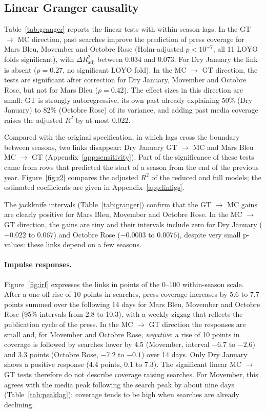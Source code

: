 \documentclass[11pt,a4paper]{article}
\begin{document}
\subsection{Linear Granger causality}
Table~\ref{tab:granger} reports the linear tests with within-season lags. In the GT $\to$ MC direction, past searches improve the prediction of press coverage for Mars Bleu, Movember and Octobre Rose (Holm-adjusted $p<10^{-7}$, all 11 LOYO folds significant), with $\Delta R^2_{\mathrm{adj}}$ between 0.034 and 0.073. For Dry January the link is absent ($p=0.27$, no significant LOYO fold). In the MC $\to$ GT direction, the tests are significant after correction for Dry January, Movember and Octobre Rose, but not for Mars Bleu ($p=0.42$). The effect sizes in this direction are small: GT is strongly autoregressive, its own past already explaining 50\% (Dry January) to 82\% (Octobre Rose) of its variance, and adding past media coverage raises the adjusted $R^2$ by at most 0.022.

Compared with the original specification, in which lags cross the boundary between seasons, two links disappear: Dry January GT $\to$ MC and Mars Bleu MC $\to$ GT (Appendix~\ref{app:sensitivity}). Part of the significance of these tests came from rows that predicted the start of a season from the end of the previous year. Figure~\ref{fig:r2} compares the adjusted $R^2$ of the reduced and full models; the estimated coefficients are given in Appendix~\ref{app:linfigs}.

The jackknife intervals (Table~\ref{tab:granger}) confirm that the GT $\to$ MC gains are clearly positive for Mars Bleu, Movember and Octobre Rose. In the MC $\to$ GT direction, the gains are tiny and their intervals include zero for Dry January ($-0.022$ to 0.067) and Octobre Rose ($-0.0003$ to 0.0076), despite very small p-values: these links depend on a few seasons.

\paragraph{Impulse responses.} Figure~\ref{fig:irf} expresses the links in points of the 0--100 within-season scale. After a one-off rise of 10 points in searches, press coverage increases by 5.6 to 7.7 points summed over the following 14 days for Mars Bleu, Movember and Octobre Rose (95\% intervals from 2.8 to 10.3), with a weekly zigzag that reflects the publication cycle of the press. In the MC $\to$ GT direction the responses are small and, for Movember and Octobre Rose, \emph{negative}: a rise of 10 points in coverage is followed by searches lower by 4.5 (Movember, interval $-6.7$ to $-2.6$) and 3.3 points (Octobre Rose, $-7.2$ to $-0.1$) over 14 days. Only Dry January shows a positive response (4.4 points, 0.1 to 7.3). The significant linear MC $\to$ GT tests therefore do not describe coverage raising searches. For Movember, this agrees with the media peak following the search peak by about nine days (Table~\ref{tab:peaklag}): coverage tends to be high when searches are already declining.
\end{document}
